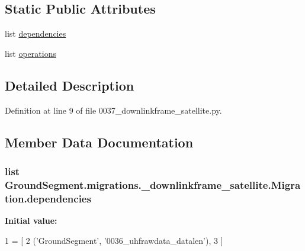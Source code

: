 \subsection*{Static Public Attributes}
\begin{DoxyCompactItemize}
\item 
list \hyperlink{class_ground_segment_1_1migrations_1_10037__downlinkframe__satellite_1_1_migration_a98a5cecd83665cbe3312a0b9ec9a001e}{dependencies}
\item 
list \hyperlink{class_ground_segment_1_1migrations_1_10037__downlinkframe__satellite_1_1_migration_a5d0cc4a7feefa1ecf4c44e655d2f58af}{operations}
\end{DoxyCompactItemize}


\subsection{Detailed Description}


Definition at line 9 of file 0037\+\_\+downlinkframe\+\_\+satellite.\+py.



\subsection{Member Data Documentation}
\hypertarget{class_ground_segment_1_1migrations_1_10037__downlinkframe__satellite_1_1_migration_a98a5cecd83665cbe3312a0b9ec9a001e}{}
\subsubsection[{dependencies}]{\setlength{\rightskip}{0pt plus 5cm}list Ground\+Segment.\+migrations.\+\_\+downlinkframe\+\_\+satellite.\+Migration.\+dependencies\hspace{0.3cm}{\ttfamily [static]}}\label{class_ground_segment_1_1migrations_1_10037__downlinkframe__satellite_1_1_migration_a98a5cecd83665cbe3312a0b9ec9a001e}
{\bfseries Initial value\+:}
\begin{DoxyCode}
1 = [
2         (\textcolor{stringliteral}{'GroundSegment'}, \textcolor{stringliteral}{'0036\_uhfrawdata\_datalen'}),
3     ]
\end{DoxyCode}


